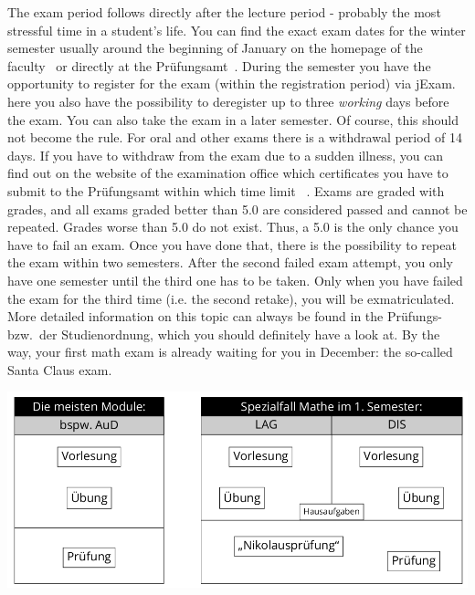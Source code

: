 \label{sec:pruefungen}
The exam period follows directly after the lecture period - probably the most stressful time in a student's life. You can find the exact exam dates for the winter semester usually around the beginning of January on the homepage of the faculty~ or directly at the Prüfungsamt~.
During the semester you have the opportunity to register for the exam (within the registration period) via jExam.
here you also have the possibility to deregister up to three \emph{working} days before the exam. You can also take the exam in a later semester. Of course, this should not become the rule. For oral and other exams there is a withdrawal period of 14 days.
If you have to withdraw from the exam due to a sudden illness, you can find out on the website of the examination office which certificates you have to submit to the Prüfungsamt within which time limit ~.
Exams are graded with grades, and all exams graded better than 5.0 are considered passed and cannot be repeated. Grades worse than 5.0 do not exist. Thus, a 5.0 is the only chance you have to fail an exam. Once you have done that, there is the possibility to repeat the exam within two semesters. After the second failed exam attempt, you only have one semester until the third one has to be taken. Only when you have failed the exam for the third time (i.e. the second retake), you will be exmatriculated. More detailed information on this topic can always be found in the Prüfungs- bzw.\ der Studienordnung, which you should definitely have a look at.
By the way, your first math exam is already waiting for you in December: the so-called Santa Claus exam.

\includegraphics{img/nikolauspruefung.png}

